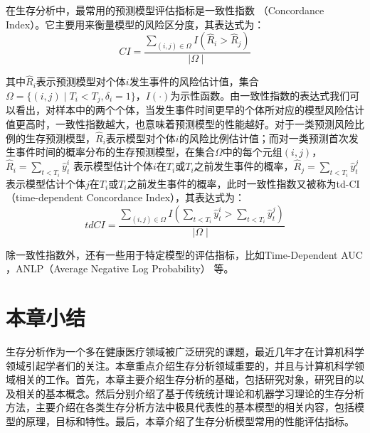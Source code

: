 在生存分析中，最常用的预测模型评估指标是一致性指数 （Concordance Index）。它主要用来衡量模型的风险区分度，其表达式为：
\begin{equation}
CI=\frac{\sum_{(i,j)\in \Omega} I(\hat{R}_i > \hat{R}_j)}{\mid \Omega \mid} \label{F13}
\end{equation}

其中$\hat{R}_i$表示预测模型对个体$i$发生事件的风险估计值，集合$\Omega=\{(i,j)\mid T_i<T_j,\delta_i=1\}$，$I(\cdot)$为示性函数。由一致性指数的表达式我们可以看出，对样本中的两个个体，当发生事件时间更早的个体所对应的模型风险估计值更高时，一致性指数越大，也意味着预测模型的性能越好。对于一类预测风险比例的生存预测模型，$\hat{R}_i$表示模型对个体$i$的风险比例估计值；而对一类预测首次发生事件时间的概率分布的生存预测模型，在集合$\Omega$中的每个元组$(i,j)$，$\hat{R}_i=\sum_{t<T_i} \hat{y}_t^i$ 表示模型估计个体$i$在$T_i$或$T_i$之前发生事件的概率，$\hat{R}_j=\sum_{t<T_i} \hat{y}_t^j$ 表示模型估计个体$j$在$T_i$或$T_i$之前发生事件的概率，此时一致性指数又被称为td-CI （time-dependent Concordance Index），其表达式为：
\begin{equation}
tdCI=\frac{\sum_{(i,j)\in \Omega} I(\sum_{t<T_i} \hat{y}_t^i > \sum_{t<T_i} \hat{y}_t^j)}{\mid \Omega \mid} \label{F14}
\end{equation}

除一致性指数外，还有一些用于特定模型的评估指标，比如Time-Dependent AUC ，ANLP（Average Negative Log Probability） 等。

\section{本章小结}

生存分析作为一个多在健康医疗领域被广泛研究的课题，最近几年才在计算机科学领域引起学者们的关注。本章重点介绍生存分析领域重要的，并且与计算机科学领域相关的工作。首先，本章主要介绍生存分析的基础，包括研究对象，研究目的以及相关的基本概念。然后分别介绍了基于传统统计理论和机器学习理论的生存分析方法，主要介绍在各类生存分析方法中极具代表性的基本模型的相关内容，包括模型的原理，目标和特性。最后，本章介绍了生存分析模型常用的性能评估指标。
